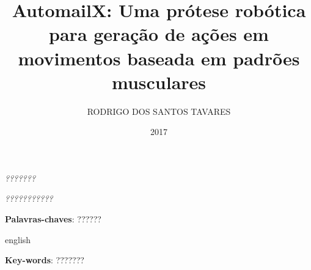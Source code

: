 \documentclass[
	12pt,				%
    oneside,
	a4paper,			%
	chapter=TITLE,		%
	english,			%
	brazil				%
	]{abntex2}
\title{AutomailX\todo{Alterar o título}: Uma prótese robótica para geração de ações em movimentos baseada em padrões musculares}
\author{RODRIGO DOS SANTOS TAVARES}
\date{2017}
\begin{document}
\frenchspacing


\imprimircapa{}

\imprimirfolhaderosto{}

\imprimirfolhadeaprovacao{}
\begin{dedicatoria}
   \vspace*{\fill}
   \centering
   \noindent
   \textit{???????} \vspace*{\fill}%
\end{dedicatoria}

\begin{agradecimentos}
  \lipsum[1]%
\end{agradecimentos}

\begin{epigrafe}
    \vspace*{\fill}
	\begin{flushright}
		\textit{???????????} %
	\end{flushright}
\end{epigrafe}


\setlength{\absparsep}{18pt} %
\begin{resumo}
  \lipsum[1] %

 \vspace{\onelineskip}

 \noindent
 \textbf{Palavras-chaves}: ??????%
\end{resumo}

\begin{resumo}[Abstract]
 \begin{otherlanguage*}{english}
   \lipsum[1] %

   \vspace{\onelineskip}

   \noindent
   \textbf{Key-words}: ???????%
 \end{otherlanguage*}
\end{resumo}
\listoffigures*
\cleardoublepage{}
\end{document}
